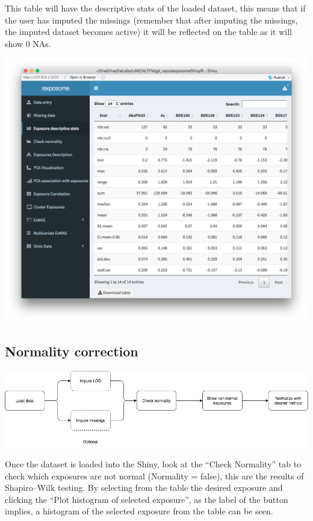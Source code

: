 \documentclass[
]{book}
\begin{document}
This table will have the descriptive stats of the loaded dataset, this means that if the user has imputed the missings (remember that after imputing the missings, the imputed dataset becomes active) it will be reflected on the table as it will show 0 NAs.

\includegraphics{images/analysis2_4.png}

\hypertarget{normality-correction}{%
\subsection{Normality correction}\label{normality-correction}}

\includegraphics{images/analysis3_1.png}

Once the dataset is loaded into the Shiny, look at the ``Check Normality'' tab to check which exposures are not normal (Normality = false), this are the results of Shapiro--Wilk testing. By selecting from the table the desired exposure and clicking the ``Plot histogram of selected exposure'', as the label of the button implies, a histogram of the selected exposure from the table can be seen.
\end{document}
